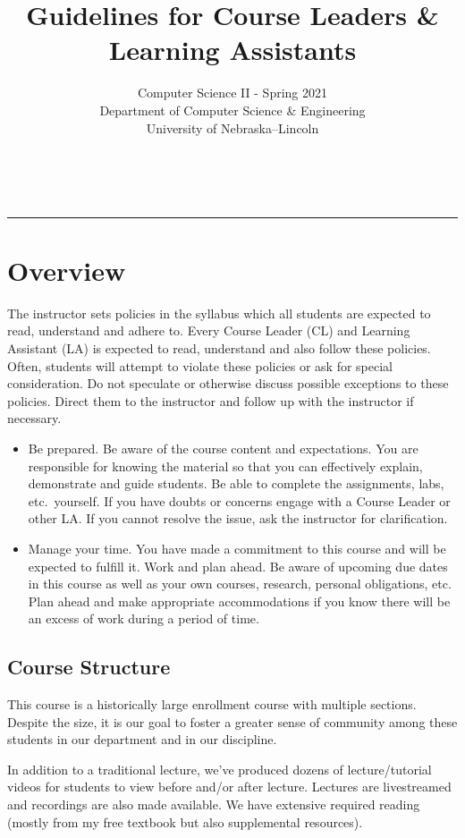 \documentclass[12pt]{scrartcl}
\title{Guidelines for Course Leaders \& Learning Assistants}\let\Title\@title
\subtitle{Computer Science II - Spring 2021\\
{\small
\vskip1cm
Department of Computer Science \& Engineering \\
University of Nebraska--Lincoln}
\vskip-1cm}
\date{~}
\begin{document}
\maketitle


\hrule

\section*{Overview}

The instructor sets policies in the syllabus which all students 
are expected to read, understand and adhere to. Every Course Leader
(CL) and Learning Assistant (LA) is expected to read, understand 
and also follow these policies.  Often, students will attempt to 
violate these policies or ask for special consideration.  Do not 
speculate or otherwise discuss possible exceptions to these policies.  
Direct them to the instructor and follow up with the instructor if 
necessary.

\begin{itemize}
  \item Be prepared.  Be aware of the course content and expectations.
  You are responsible for knowing the material so that you can effectively
  explain, demonstrate and guide students.  Be able to complete the assignments, 
  labs, etc.\ yourself.  If you have doubts or concerns engage with
  a Course Leader or other LA.  If you cannot resolve the issue, ask the 
  instructor for clarification.
  \item Manage your time.  You have made a commitment to this course and
  will be expected to fulfill it.  Work and plan ahead.  Be aware of 
  upcoming due dates in this course as well as your own courses, research, 
  personal obligations, etc.  Plan ahead and make appropriate accommodations 
  if you know there will be an excess of work during a period of time.
\end{itemize}

\subsection*{Course Structure}

This course is a historically large enrollment course with
multiple sections.  
Despite the size, it is our goal to foster a greater sense of 
community among these students in our department and in our 
discipline.  

In addition to a traditional lecture, we've produced dozens of 
lecture/tutorial videos for students to view before and/or after lecture. 
Lectures are livestreamed and recordings are also made available.
We have extensive required reading (mostly from my free textbook but 
also supplemental resources).  
\end{document}
